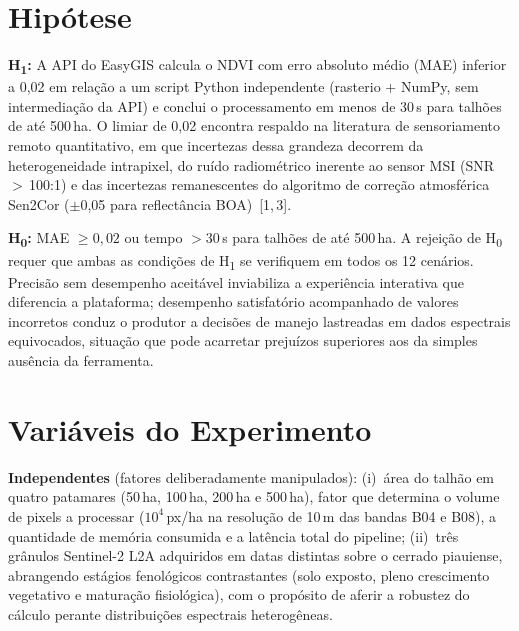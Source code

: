\documentclass[10pt, a4paper, twocolumn]{article}
\begin{document}
\section{Hipótese}

\textbf{H\textsubscript{1}:} A API do EasyGIS calcula o NDVI com erro absoluto médio (MAE) inferior a 0,02 em relação a um script Python independente (rasterio + NumPy, sem intermediação da API) e conclui o processamento em menos de 30\,s para talhões de até 500\,ha. O limiar de 0,02 encontra respaldo na literatura de sensoriamento remoto quantitativo, em que incertezas dessa grandeza decorrem da heterogeneidade intrapixel, do ruído radiométrico inerente ao sensor MSI (SNR\,$>$\,100:1) e das incertezas remanescentes do algoritmo de correção atmosférica Sen2Cor ($\pm$0,05 para reflectância BOA)~[1,\,3].

\textbf{H\textsubscript{0}:} MAE $\geq 0{,}02$ ou tempo $> 30$\,s para talhões de até 500\,ha. A rejeição de H\textsubscript{0} requer que ambas as condições de H\textsubscript{1} se verifiquem em todos os 12 cenários. Precisão sem desempenho aceitável inviabiliza a experiência interativa que diferencia a plataforma; desempenho satisfatório acompanhado de valores incorretos conduz o produtor a decisões de manejo lastreadas em dados espectrais equivocados, situação que pode acarretar prejuízos superiores aos da simples ausência da ferramenta.

\section{Variáveis do Experimento}

\textbf{Independentes} (fatores deliberadamente manipulados): (i)~área do talhão em quatro patamares (50\,ha, 100\,ha, 200\,ha e 500\,ha), fator que determina o volume de pixels a processar ($10^4$\,px/ha na resolução de 10\,m das bandas B04 e B08), a quantidade de memória consumida e a latência total do pipeline; (ii)~três grânulos Sentinel-2 L2A adquiridos em datas distintas sobre o cerrado piauiense, abrangendo estágios fenológicos contrastantes (solo exposto, pleno crescimento vegetativo e maturação fisiológica), com o propósito de aferir a robustez do cálculo perante distribuições espectrais heterogêneas.
\end{document}
